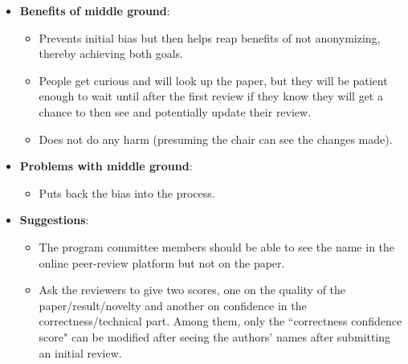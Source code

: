 \documentclass{article}
\begin{document}
{\begin{itemize}
\begin{itemize}
    \item It will force reviewers to read the paper carefully rather than judging the quality based on authors.
    
    \item It is for the papers in the grey area that author identity will bias decisions, and these papers are precisely the ones for which the discussion is critical.

    \item Revealing author identities may make the reviewer more careful if the reviewer knows that the identities will be known at the discussion phase. 
\end{itemize} 

\item {\bf Benefits of middle ground}:
\begin{itemize}
    \item Prevents initial bias but then helps reap benefits of not anonymizing, thereby achieving both goals. 
    
    \item People get curious and will look up the paper,  but they will be patient enough to wait until after the first review if they know they will get a chance to then see and potentially update their review. 
    
    \item Does not do any harm (presuming the chair can see the changes made).
\end{itemize}

\item {\bf Problems with middle ground}:
\begin{itemize}
    \item Puts back the bias into the process.
\end{itemize}

\item {\bf Suggestions}: 
\begin{itemize}
    \item The program committee members should be able to see the name in the online peer-review platform but not on the paper.
    
    \item Ask the reviewers to give two scores, one on the quality of the paper/result/novelty and another on confidence in the correctness/technical part. Among them, only the ``correctness confidence score" can be modified after seeing the authors' names after submitting an initial review.
      

\end{itemize}
\end{itemize}}
\end{document}
